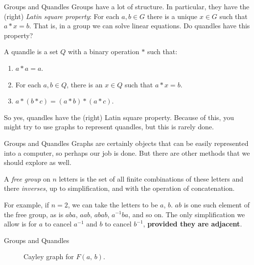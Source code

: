 \documentclass{beamer}
\begin{document}
    \begin{frame}{Groups and Quandles}
        Groups have a lot of structure. In particular, they have the (right)
        \textit{Latin square property}: For each
        $a,b\in{G}$ there is a unique $x\in{G}$ such that $a*x=b$. That is,
        in a group we can solve linear equations. Do quandles have this property?
        \par\hfill\par
        A quandle is a set $Q$ with a binary operation $*$ such that:
        \begin{enumerate}
            \item
                $a*a=a$.
            \item
                For each $a,b\in{Q}$, there is an $x\in{Q}$ such that
                $a*x=b$.
            \item
                $a*(b*c)=(a*b)*(a*c)$.
        \end{enumerate}
        So yes, quandles have the (right) Latin square property. Because of this,
        you might try to use graphs to represent quandles, but this is rarely done.
    \end{frame}
    \begin{frame}{Groups and Quandles}
        Graphs are certainly objects that can be easily represented into a
        computer, so perhaps our job is done. But there are other methods that
        we should explore as well.
        \par\hfill\par
        A \textit{free group} on $n$ letters is the set of all finite combinations
        of these letters and there \textit{inverses}, up to simplification, and
        with the operation of concatenation.
        \par\hfill\par
        For example, if $n=2$, we can take the letters to be $a$, $b$.
        $ab$ is one such element of the free group, as is $aba$, $aab$,
        $abab$, $a^{-1}ba$, and so on. The only simplification we allow is for
        $a$ to cancel $a^{-1}$ and $b$ to cancel $b^{-1}$,
        \textbf{provided they are adjacent}.
    \end{frame}
    \begin{frame}{Groups and Quandles}
        \begin{figure}
            \centering
            \caption{Cayley graph for $F(a,\,b)$.}
        \end{figure}
    \end{frame}
\end{document}
